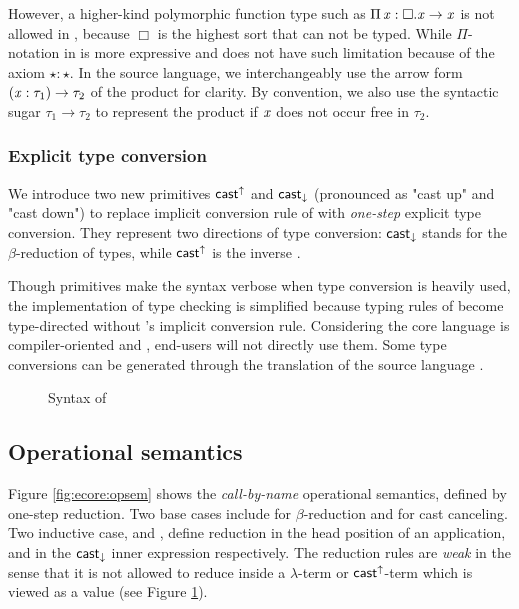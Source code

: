 However, a higher-kind polymorphic function type such as $\Pi \, \mathit{x}  :  \Box  .  \mathit{x}  \rightarrow  \mathit{x}$ is not allowed in \cc, because $\Box$ is the highest sort that can not be typed. While $ \Pi $-notation in \ecore is more expressive and does not have such limitation because of the axiom $\star:\star$. In the source language, we interchangeably use the arrow form $(  \mathit{x}  :  \tau_{{\mathrm{1}}}  )  \rightarrow  \tau_{{\mathrm{2}}}$ of the product for clarity. By convention, we also use the syntactic sugar $\tau_{{\mathrm{1}}}  \longrightarrow  \tau_{{\mathrm{2}}}$ to represent the product if $\mathit{x}$ does not occur free in $\tau_{{\mathrm{2}}}$.

\subsubsection{Explicit type conversion}
We introduce two new primitives $ \mathsf{cast}^{\uparrow} $ and $ \mathsf{cast}_{\downarrow} $ (pronounced as "cast up" and "cast down") to replace implicit conversion rule of \cc with \emph{one-step} explicit type conversion. They represent two directions of type conversion: $ \mathsf{cast}_{\downarrow} $ stands for the $\beta$-reduction of types, while $ \mathsf{cast}^{\uparrow} $ is the inverse .

Though \cast primitives make the syntax verbose when type conversion is heavily used, the implementation of type checking is simplified because typing rules of \ecore become type-directed without \cc's implicit conversion rule. Considering the core language is compiler-oriented and , end-users will not directly use them. Some type conversions can be generated through the translation of the source language \fixme{(\S \ref{sec:src})}.

\begin{figure}
    \gram{\ottec\ottinterrule
        \ottG\ottinterrule
        \ottv}
    \caption{Syntax of \ecore}
    \label{fig:ecore:syntax}
\end{figure}

\subsection{Operational semantics}\label{sec:ecore:opsem}
Figure \ref{fig:ecore:opsem} shows the \emph{call-by-name} operational semantics, defined by one-step reduction. Two base cases include  for $\beta$-reduction and  for cast canceling. Two inductive case,  and , define reduction in the head position of an application, and in the $ \mathsf{cast}_{\downarrow} $ inner expression respectively. The reduction rules are \emph{weak} in the sense that it is not allowed to reduce inside a $\lambda$-term or $ \mathsf{cast}^{\uparrow} $-term which is viewed as a value (see Figure \ref{fig:ecore:syntax}).

